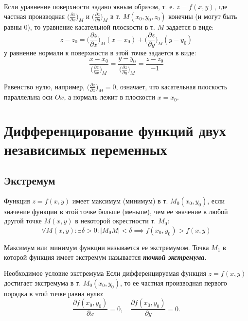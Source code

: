 \documentclass[a4paper,12pt,oneside]{extbook}
\theoremstyle{numbered}
\theoremstyle{unnumbered}
\theoremstyle{named}
\theoremstyle{unnumbered}
\theoremstyle{named}
\theoremstyle{named}
\theoremstyle{named}
\begin{document}
Если уравнение поверхности задано явным образом, т. е. \(z = f(x, y)\), где частная производная \(\Big(\frac{\partial z}{\partial x}\Big)_M\) и \(\Big(\frac{\partial z}{\partial y}\Big)_M\) в т. \(M(x_0, y_0, z_0)\) конечны (и могут быть равны 0), то уравнение касательной плоскости в т. \(M\) задается в виде:
\begin{equation}
    z - z_0 = \Big(\frac{\partial z}{\partial x}\Big)_M (x - x_0) + \Big(\frac{\partial z}{\partial y}\Big)_M (y - y_0)
\end{equation}
у равнение нормали к поверхности в этой точке задается в виде:
\begin{equation}
    \frac{x - x_0}{\Big(\frac{\partial z}{\partial x}\Big)_M} = \frac{y - y_0}{\Big(\frac{\partial z}{\partial y}\Big)_M} = \frac{z - z_0}{-1}
\end{equation}

Равенство нулю, например, \(\Big(\frac{\partial z}{\partial x}\Big)_M = 0\), означает, что касательная плоскость параллельна оси \(Ox\), а нормаль лежит в плоскости \(x = x_0\).

\section{Дифференцирование функций двух независимых переменных}%
\label{sec:Дифференцирование функций двух независимых переменных}

\subsection{Экстремум}%
\label{sub:Экстремум}

Функция \(z = f(x, y)\) имеет максимум (минимум) в т. \(M_0(x_0, y_0)\), если значение функции в этой точке больше (меньше), чем ее значение в любой другой точке \(M(x, y)\) в некоторой окрестности т. \(M_0\):
\begin{equation}
    \forall M(x, y): \exists \delta >0: |M_0 M| < \delta \implies f(x_0, y_0) > f(x, y)
\end{equation}

Максимум или минимум функции называется ее экстремумом. Точка \(M_1\) в которой функция имеет экстремум называется \textbf{\textit{точкой экстремума}}.

Необходимое условие экстремума
Если дифференцируемая функция \(z = f(x, y)\) достигает экстремума в т. \(M_0(x_0, y_0)\), то ее частная производная первого порядка в этой точке равна нулю:
\begin{equation}
    \frac{\partial f(x_0, y_0)}{\partial x} = 0, \quad \frac{\partial f(x_0, y_0)}{\partial y} = 0.
\end{equation}
\end{document}

